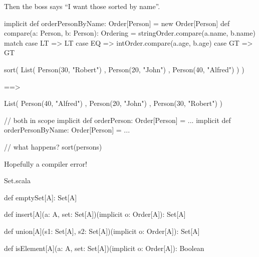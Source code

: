 \documentclass[usenames,dvipsnames,svgnames,table,aspectratio=169,mathserif]{beamer}
\newcommand{\nl}{\vspace{\baselineskip}}
\newcommand{\pnl}{\pause \nl}
\begin{document}
\begin{frame}[fragile]
Then the boss says ``I want those sorted by name''.

\pnl

\begin{scalacode}
implicit def orderPersonByName: Order[Person] = new Order[Person] {
  def compare(a: Person, b: Person): Ordering =
    stringOrder.compare(a.name, b.name) match {
      case LT => LT
      case EQ => intOrder.compare(a.age, b.age)
      case GT => GT
    }
}
\end{scalacode}


\end{frame}


\begin{frame}[fragile]
\begin{scalacode}
sort(
  List(
    Person(30, "Robert")
  , Person(20, "John")
  , Person(40, "Alfred")
  )
)
\end{scalacode}

\pnl

\begin{scalacode}
==>

List(
  Person(40, "Alfred")
, Person(20, "John")
, Person(30, "Robert")
)

\end{scalacode}
\end{frame}


\begin{frame}[fragile]
\begin{scalacode}
// both in scope
implicit def orderPerson: Order[Person] = ...
implicit def orderPersonByName: Order[Person] = ...

// what happens?
sort(persons)
\end{scalacode}

\pnl

Hopefully a compiler error!
\end{frame}





\begin{frame}[fragile]
\begin{block}{Set.scala}
\begin{scalacode}
def emptySet[A]: Set[A]

def insert[A](a: A, set: Set[A])(implicit o: Order[A]): Set[A]

def union[A](s1: Set[A], s2: Set[A])(implicit o: Order[A]): Set[A]

def isElement[A](a: A, set: Set[A])(implicit o: Order[A]): Boolean
\end{scalacode}
\end{block}
\end{frame}
\end{document}
